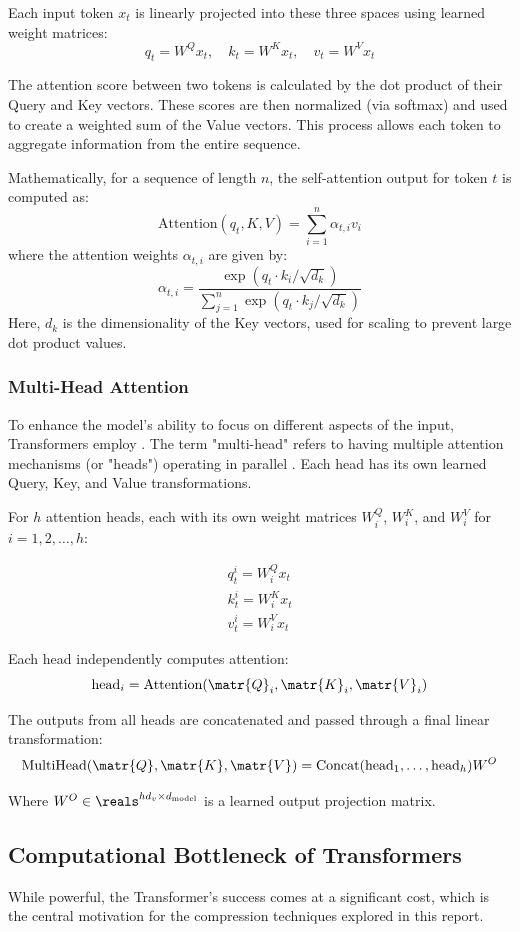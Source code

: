 Each input token $x_t$ is linearly projected into these three spaces using learned weight matrices:
\[
q_t = W^Q x_t, \quad k_t = W^K x_t, \quad v_t = W^V x_t
\]

The attention score between two tokens is calculated by the dot product of their Query and Key vectors. These scores are then normalized (via softmax) and used to create a weighted sum of the Value vectors. This process allows each token to aggregate information from the entire sequence.

Mathematically, for a sequence of length $n$, the self-attention output for token $t$ is computed as:
\[
\text{Attention}(q_t, K, V) = \sum_{i=1}^{n} \alpha_{t,i} v_i
\]
where the attention weights $\alpha_{t,i}$ are given by:
\[
\alpha_{t,i} = \frac{\exp(q_t \cdot k_i / \sqrt{d_k})}{\sum_{j=1}^{n} \exp(q_t \cdot k_j / \sqrt{d_k})}
\]
Here, $d_k$ is the dimensionality of the Key vectors, used for scaling to prevent large dot product values.

\subsubsection{Multi-Head Attention}
To enhance the model's ability to focus on different aspects of the input, Transformers employ .
The term "multi-head" refers to having multiple attention mechanisms (or "heads") operating in parallel \cite{vaswani2017attention}. Each head has its own learned Query, Key, and Value transformations.

For $h$ attention heads, each with its own weight matrices $W_i^Q$, $W_i^K$, and $W_i^V$ for $i = 1, 2, \ldots, h$:

\begin{gather*}
  q_t^i = W_i^Q x_t\\
  k_t^i = W_i^K x_t\\
  v_t^i = W_i^V x_t
\end{gather*}

Each head independently computes attention:
\[
  \text{head}_i = \text{Attention}(\matr{Q}_i, \matr{K}_i, \matr{V}_i)
\]

The outputs from all heads are concatenated and passed through a final linear transformation:
\[
  \text{MultiHead}(\matr{Q}, \matr{K}, \matr{V}) = \text{Concat}(\text{head}_1, \ldots, \text{head}_h) W^O
\]

Where $W^O \in \reals^{hd_v \times d_{\text{model}}}$ is a learned output projection matrix.


\subsection{Computational Bottleneck of Transformers}
\label{sec:transformer_bottleneck}
While powerful, the Transformer's success comes at a significant cost, which is the central motivation for the compression techniques explored in this report.

